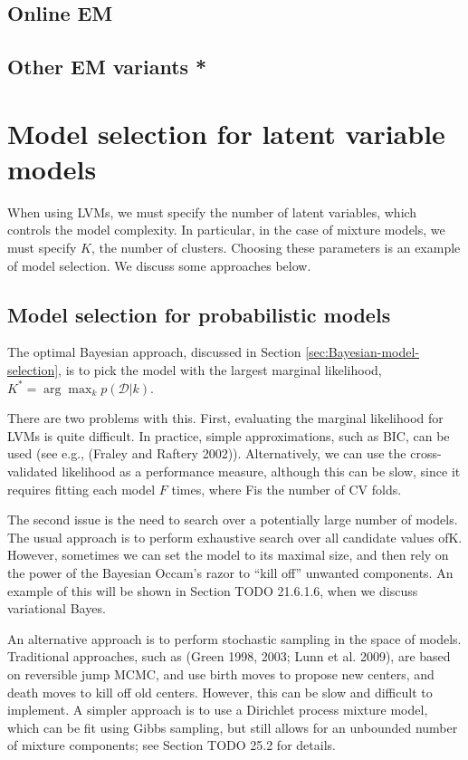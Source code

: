 \subsection{Online EM}


\subsection{Other EM variants *}


\section{Model selection for latent variable models}
\label{sec:Model-selection-for-LVM}
When using LVMs, we must specify the number of latent variables, which controls the model complexity. In particular, in the case of mixture models, we must specify $K$, the number of clusters. Choosing these parameters is an example of model selection. We discuss some approaches below.


\subsection{Model selection for probabilistic models}
The optimal Bayesian approach, discussed in Section \ref{sec:Bayesian-model-selection}, is to pick the model with the largest marginal likelihood, $K^*=\arg\max_k p(\mathcal{D}|k)$.

There are two problems with this. First, evaluating the marginal likelihood for LVMs is quite difficult. In practice, simple approximations, such as BIC, can be used (see e.g., (Fraley and Raftery 2002)). Alternatively, we can use the cross-validated likelihood as a performance measure, although this can be slow, since it requires fitting each model $F$ times, where Fis the number of CV folds.

The second issue is the need to search over a potentially large number of models. The usual approach is to perform exhaustive search over all candidate values ofK. However, sometimes we can set the model to its maximal size, and then rely on the power of the Bayesian Occam’s razor to “kill off” unwanted components. An example of this will be shown in Section TODO 21.6.1.6, when we discuss variational Bayes.

An alternative approach is to perform stochastic sampling in the space of models. Traditional approaches, such as (Green 1998, 2003; Lunn et al. 2009), are based on reversible jump MCMC, and use birth moves to propose new centers, and death moves to kill off old centers. However, this can be slow and difficult to implement. A simpler approach is to use a Dirichlet process mixture model, which can be fit using Gibbs sampling, but still allows for an unbounded number of mixture components; see Section TODO 25.2 for details.

